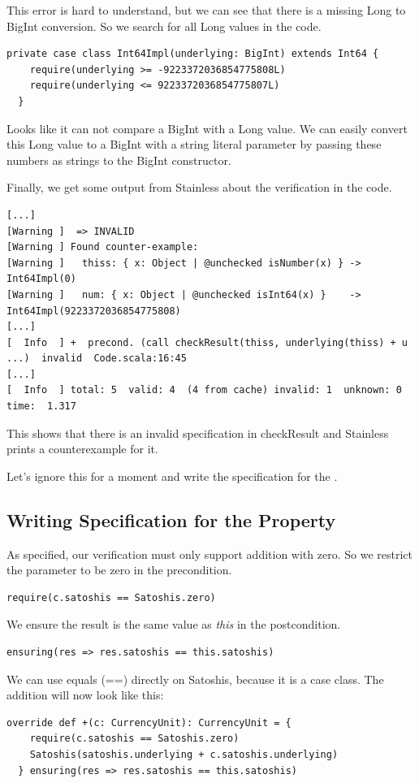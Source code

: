 \documentclass[runningheads]{llncs}
\begin{document}
This error is hard to understand, but we can see that there is a missing Long to BigInt conversion.
So we search for all Long values in the code.
\begin{lstlisting}[style=scala]
  private case class Int64Impl(underlying: BigInt) extends Int64 {
    require(underlying >= -9223372036854775808L)
    require(underlying <= 9223372036854775807L)
  }
\end{lstlisting}

Looks like it can not compare a BigInt with a Long value.
We can easily convert this Long value to a BigInt with a string literal parameter by passing these numbers as strings to the BigInt constructor.

Finally, we get some output from Stainless about the verification in the code.
\begin{lstlisting}[style=stainless]
[...]
[Warning ]  => INVALID
[Warning ] Found counter-example:
[Warning ]   thiss: { x: Object | @unchecked isNumber(x) } -> Int64Impl(0)
[Warning ]   num: { x: Object | @unchecked isInt64(x) }    -> Int64Impl(9223372036854775808)
[...]
[  Info  ] +  precond. (call checkResult(thiss, underlying(thiss) + u ...)  invalid  Code.scala:16:45
[...]
[  Info  ] total: 5  valid: 4  (4 from cache) invalid: 1  unknown: 0  time:  1.317
\end{lstlisting}

This shows that there is an invalid specification in checkResult and Stainless prints a counterexample for it.

Let's ignore this for a moment and write the specification for the .


\subsection{Writing Specification for the Property}

As specified, our verification must only support addition with zero.
So we restrict the parameter to be zero in the precondition.
\begin{lstlisting}[style=scala]
  require(c.satoshis == Satoshis.zero)
\end{lstlisting}

We ensure the result is the same value as \emph{this} in the postcondition.
\begin{lstlisting}[style=scala]
  ensuring(res => res.satoshis == this.satoshis)
\end{lstlisting}

We can use equals (==) directly on Satoshis, because it is a case class.
The addition will now look like this:
\begin{lstlisting}[style=scala]
  override def +(c: CurrencyUnit): CurrencyUnit = {
    require(c.satoshis == Satoshis.zero)
    Satoshis(satoshis.underlying + c.satoshis.underlying)
  } ensuring(res => res.satoshis == this.satoshis)
\end{lstlisting}
\end{document}
